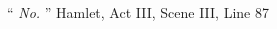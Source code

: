 \documentclass[12pt,a4paper,twoside,openright,justified]{book}
\begin{document}
\pagestyle{empty}



\cleardoublepage
{
\vspace*{0.2\textheight}
\large
\noindent\hfill\enquote{\itshape 
No.
{}}
\bigbreak
}
\large
\hfill Hamlet, Act III, Scene III, Line 87
\normalsize


\justifying

\setlength{\skip\footins}{8mm}

\setlength{\parindent}{0pt}
\setlength{\parskip}{2mm}







\frontmatter
\begin{spacing}{1.3}
\pagestyle{toclof}
\tableofcontents  %
\clearpage
\listoffigures %
\clearpage
\end{spacing}


\mainmatter











%


%

%
\clearpage
\end{document}
